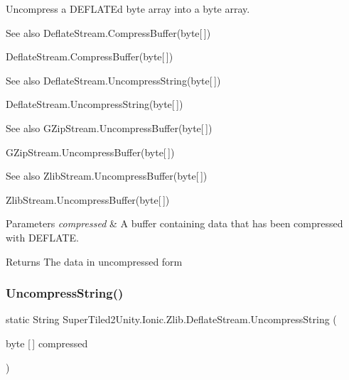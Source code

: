 Uncompress a D\+E\+F\+L\+A\+TE\textquotesingle{}d byte array into a byte array. 

\begin{DoxySeeAlso}{See also}
Deflate\+Stream.\+Compress\+Buffer(byte\mbox{[}$\,$\mbox{]})


\end{DoxySeeAlso}
Deflate\+Stream.\+Compress\+Buffer(byte\mbox{[}$\,$\mbox{]})

\begin{DoxySeeAlso}{See also}
Deflate\+Stream.\+Uncompress\+String(byte\mbox{[}$\,$\mbox{]})


\end{DoxySeeAlso}
Deflate\+Stream.\+Uncompress\+String(byte\mbox{[}$\,$\mbox{]})

\begin{DoxySeeAlso}{See also}
G\+Zip\+Stream.\+Uncompress\+Buffer(byte\mbox{[}$\,$\mbox{]})


\end{DoxySeeAlso}
G\+Zip\+Stream.\+Uncompress\+Buffer(byte\mbox{[}$\,$\mbox{]})

\begin{DoxySeeAlso}{See also}
Zlib\+Stream.\+Uncompress\+Buffer(byte\mbox{[}$\,$\mbox{]})


\end{DoxySeeAlso}
Zlib\+Stream.\+Uncompress\+Buffer(byte\mbox{[}$\,$\mbox{]})


\begin{DoxyParams}{Parameters}
{\em compressed} & A buffer containing data that has been compressed with D\+E\+F\+L\+A\+TE. \\
\hline
\end{DoxyParams}


\begin{DoxyReturn}{Returns}
The data in uncompressed form
\end{DoxyReturn}
\mbox{\label{class_super_tiled2_unity_1_1_ionic_1_1_zlib_1_1_deflate_stream_a34d1ca9ddbd439c5b81565100ffee711}} 
\subsubsection{\texorpdfstring{Uncompress\+String()}{UncompressString()}}
{\footnotesize\ttfamily static String Super\+Tiled2\+Unity.\+Ionic.\+Zlib.\+Deflate\+Stream.\+Uncompress\+String (\begin{DoxyParamCaption}\item[{byte \mbox{[}$\,$\mbox{]}}]{compressed }\end{DoxyParamCaption})\hspace{0.3cm}{\ttfamily [static]}}




